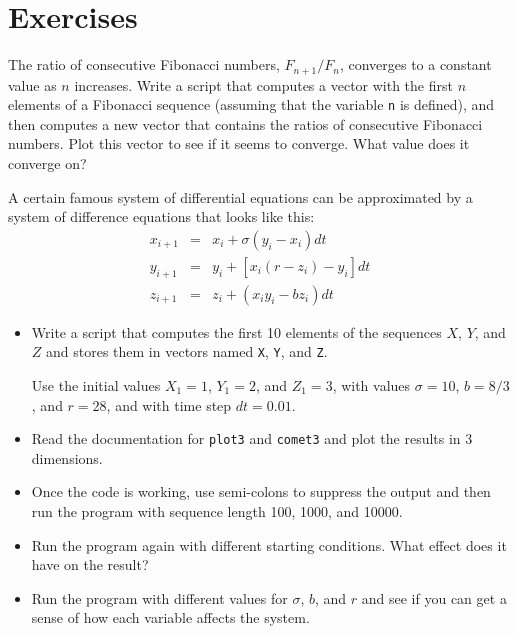 \documentclass[
]{book}
\begin{document}
\section{Exercises}

\begin{ex}
\label{ex:fibratio}

The ratio of consecutive Fibonacci numbers, $F_{n+1}/F_{n}$, converges
to a constant value as $n$ increases.  Write a script that computes
a vector with the first $n$ elements of a Fibonacci sequence (assuming
that the variable {\tt n} is defined), and then computes a new
vector that contains the ratios of consecutive Fibonacci numbers.
Plot this vector to see if it seems to converge.  What value does
it converge on?

\end{ex}

\begin{ex}
A certain famous system of differential equations can be approximated
by a system of difference equations that looks like this:
%
\begin{eqnarray}
x_{i+1} &=& x_i + \sigma \left( y_i - x_i \right) dt  \\
y_{i+1} &=& y_i + \left[ x_i (r - z_i) - y_i \right] dt   \\
z_{i+1} &=& z_i + \left( x_i y_i - b z_i \right) dt
\end{eqnarray}
%
\begin{itemize}

\item Write a script that computes the first 10 elements of the sequences
$X$, $Y$, and $Z$ and stores them in vectors named {\tt X}, {\tt Y},
and {\tt Z}.

Use the initial values $X_1 = 1$, $Y_1 = 2$, and $Z_1 = 3$, with values
$\sigma = 10$, $b = 8/3$, and $r = 28$, and with time step $dt = 0.01$.

\item Read the documentation for {\tt plot3} and {\tt comet3} and
plot the results in 3 dimensions.

\item Once the code is working, use semi-colons to suppress the output
and then run the program with sequence length 100, 1000, and 10000.

\item Run the program again with different starting conditions.
What effect does it have on the result?

\item Run the program with different values for $\sigma$, $b$, and $r$
and see if you can get a sense of how each variable affects the
system.

\end{itemize}

\end{ex}
\end{document}
